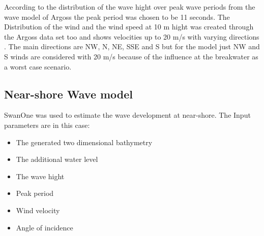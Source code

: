 According to the distribution of the wave hight over peak wave periods from the wave model of Argoss %
the peak period was chosen to be 11 seconds.
The Distribution of the wind and the wind speed at 10 m hight was created through the Argoss data set too and shows velocities up to 20 m/s with varying directions
. The main  directions are NW, N, NE, SSE and S but for the model just NW and S winds are considered with 20 m/s because of the influence at the breakwater as a worst case scenario.

\subsection{Near-shore Wave model}
SwanOne was used to estimate the wave development at near-shore. The Input parameters are in this case:
\begin{itemize}
\item The generated two dimensional bathymetry
\item The additional water level
\item The wave hight
\item Peak period
\item Wind velocity
\item Angle of incidence 	
\end{itemize}

